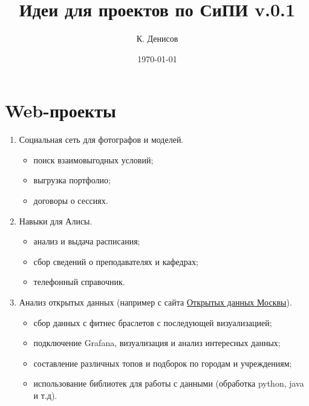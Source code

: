 \documentclass[a4paper,12pt]{article} %
\author {К. Денисов}
\title {Идеи для проектов по СиПИ v.0.1}
\date {\today}
\begin{document}
\maketitle

\section*{Web-проекты}
\begin{enumerate}
	\item Социальная сеть для фотографов и моделей.
	\begin{itemize}
		\item поиск взаимовыгодных условий;
		\item выгрузка портфолио;
		\item договоры о сессиях.
	\end{itemize}

	\item Навыки для Алисы.
		\begin{itemize}
			\item анализ и выдача расписания;
			\item сбор сведений о преподавателях и кафедрах;
			\item телефонный справочник.
		\end{itemize}
	\item Анализ открытых данных (например с сайта \href{http://www.data.mos.ru}{Открытых данных Москвы}).
		\begin{itemize}
			\item сбор данных с фитнес браслетов с последующей визуализацией;
			\item подключение Grafana, визуализация и анализ интересных данных;
			\item составление различных топов и подборок по городам и учреждениям;
			\item использование библиотек для работы с данными (обработка python, java  и т.д).
		\end{itemize}
\end{enumerate}
\end{document}
